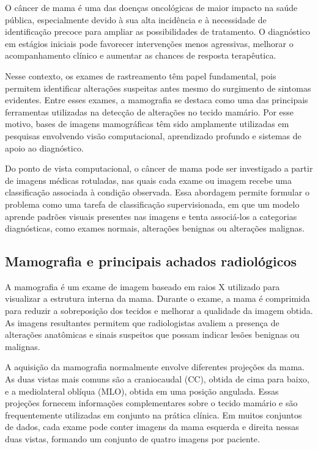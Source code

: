 \documentclass[
    12pt,
    openright,
    oneside,
    a4paper,
    english,
    brazil
]{abntex2}
\begin{document}
O câncer de mama é uma das doenças oncológicas de maior impacto na saúde pública, especialmente devido à sua alta incidência e à necessidade de identificação precoce para ampliar as possibilidades de tratamento. O diagnóstico em estágios iniciais pode favorecer intervenções menos agressivas, melhorar o acompanhamento clínico e aumentar as chances de resposta terapêutica.

Nesse contexto, os exames de rastreamento têm papel fundamental, pois permitem identificar alterações suspeitas antes mesmo do surgimento de sintomas evidentes. Entre esses exames, a mamografia se destaca como uma das principais ferramentas utilizadas na detecção de alterações no tecido mamário. Por esse motivo, bases de imagens mamográficas têm sido amplamente utilizadas em pesquisas envolvendo visão computacional, aprendizado profundo e sistemas de apoio ao diagnóstico.

Do ponto de vista computacional, o câncer de mama pode ser investigado a partir de imagens médicas rotuladas, nas quais cada exame ou imagem recebe uma classificação associada à condição observada. Essa abordagem permite formular o problema como uma tarefa de classificação supervisionada, em que um modelo aprende padrões visuais presentes nas imagens e tenta associá-los a categorias diagnósticas, como exames normais, alterações benignas ou alterações malignas.

\subsection{Mamografia e principais achados radiológicos}

A mamografia é um exame de imagem baseado em raios X utilizado para visualizar a estrutura interna da mama. Durante o exame, a mama é comprimida para reduzir a sobreposição dos tecidos e melhorar a qualidade da imagem obtida. As imagens resultantes permitem que radiologistas avaliem a presença de alterações anatômicas e sinais suspeitos que possam indicar lesões benignas ou malignas.

A aquisição da mamografia normalmente envolve diferentes projeções da mama. As duas vistas mais comuns são a craniocaudal (CC), obtida de cima para baixo, e a mediolateral oblíqua (MLO), obtida em uma posição angulada. Essas projeções fornecem informações complementares sobre o tecido mamário e são frequentemente utilizadas em conjunto na prática clínica. Em muitos conjuntos de dados, cada exame pode conter imagens da mama esquerda e direita nessas duas vistas, formando um conjunto de quatro imagens por paciente.
\end{document}

